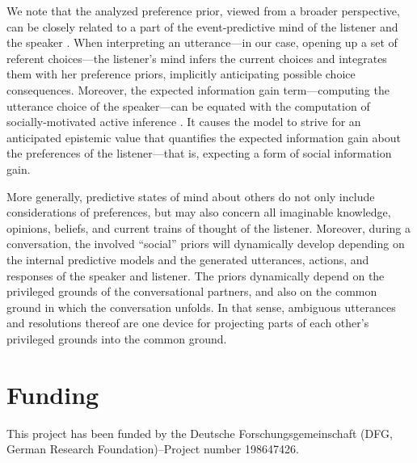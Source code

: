 \documentclass[11pt,a4paper]{article}
\begin{document}
We note that the analyzed preference prior, viewed from a broader perspective, can be closely related to a part of the event-predictive mind of the listener and the speaker \cite{Butz:2016,Butz:2017}. 
When interpreting an utterance---in our case, opening up a set of referent choices---the listener's mind infers the current choices and integrates them with her preference priors, implicitly anticipating possible choice consequences.
Moreover, the expected information gain term---computing the utterance choice of the speaker---can be equated with the computation of socially-motivated active inference \cite{Butz:2017a,Friston:2015}.
It causes the model to strive for an anticipated epistemic value that quantifies the expected information gain about the preferences of the listener---that is, expecting a form of social information gain. 


More generally, predictive states of mind about others do not only include considerations of preferences, but may also concern all imaginable knowledge, opinions, beliefs, and current trains of thought of the listener.
Moreover, during a conversation, the involved ``social'' priors will dynamically develop depending on the internal predictive models and the generated utterances, actions, and responses of the speaker and listener. 
The priors dynamically depend on the privileged grounds of the conversational partners, and also on the common ground in which the conversation unfolds.
In that sense, ambiguous utterances and resolutions thereof are one device for projecting parts of each other's privileged grounds into the common ground. 







\section*{Funding}

This project has been funded by the Deutsche Forschungsgemeinschaft (DFG, German Research Foundation)--Project number 198647426. 
\end{document}
